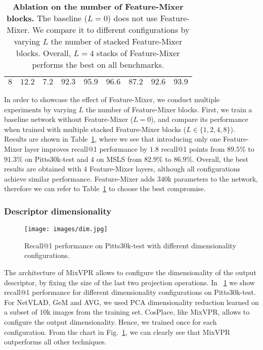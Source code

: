\documentclass[10pt,twocolumn,letterpaper]{article}
\begin{document}
\begin{table}[t]
{\begin{tabular}{|c|c|c|ccc|ccc|}
$8$                                                                   & $12.2 $                                                                          & $7.2 $                                                                    & $\mathbf{92.3}$      & $95.9 $     & $96.6 $     & $87.2 $    & $92.6 $    & $93.9 $   \\ \hline
\end{tabular}}
\caption{\textbf{Ablation on the number of Feature-Mixer blocks.} The baseline ($L=0$) does not use Feature-Mixer. We compare it to different configurations by varying $L$ the number of stacked Feature-Mixer blocks. Overall, $L=4$ stacks of Feature-Mixer performs the best on all benchmarks.}
\label{tab:feature-mixer}
\end{table}
In order to showcase the effect of Feature-Mixer, we conduct multiple experiments by varying $L$ the number of Feature-Mixer blocks. First, we train a baseline network  without Feature-Mixer ($L=0$), and compare its performance when trained with multiple stacked Feature-Mixer blocks ($L \in \{1,2,4,8\}$). Results are shown in Table~\ref{tab:feature-mixer}, where we see that introducing only one Feature-Mixer layer improves recall@1 performance by $1.8$ recall@1 points from $89.5$\% to $91.3$\% on Pitts30k-test and $4$ on MSLS  from $82.9$\% to $86.9$\%. Overall, the best results are obtained with $4$ Feature-Mixer layers, although all configurations achieve similar performance. Feature-Mixer adds $340$k parameters to the network, therefore we can refer to Table~\ref{tab:feature-mixer} to choose the best compromise. 


\subsubsection{Descriptor dimensionality}
\begin{figure}[thb]
\begin{center}
\texttt{[image: images/dim.jpg]}
\end{center}
   \caption{Recall@1 performance on Pitts30k-test with different dimensionality configurations.}
\label{fig:dim}
\end{figure}
The architecture of MixVPR allows to configure the dimensionality of the output descriptor, by fixing the size of the last two projection operations. In ~\ref{fig:dim} we show recall@1 performance for different dimensionality configurations on Pitts30k-test. For NetVLAD, GeM and AVG, we used PCA dimensionality reduction learned on a subset of $10$k images from the training set. CosPlace, like MixVPR, allows to configure the output dimensionality. Hence, we trained once for each configuration. From the chart in Fig.~\ref{fig:dim}, we can clearly see that MixVPR outperforms all other techniques. 
\end{document}
